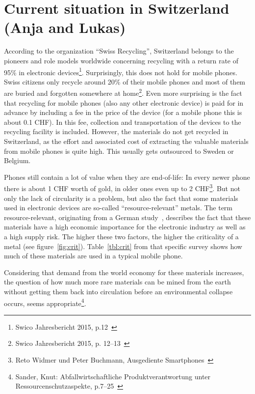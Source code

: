 \documentclass[11pt]{scrartcl}
\begin{document}
\section{Current situation in Switzerland (Anja and Lukas)}

According to the organization ``Swiss Recycling'', Switzerland belongs to the pioneers and role models worldwide concerning recycling with a return rate of 95\% in electronic devices\footnote{Swico Jahresbericht 2015, p.12~\cite{swico}}. Surprisingly, this does not hold for mobile phones. Swiss citizens only recycle around 20\% of their mobile phones and most of them are buried and forgotten somewhere at home\footnote{Swico Jahresbericht 2015, p. 12--13~\cite{swico}}. Even more surprising is the fact that recycling for mobile phones (also any other electronic device) is paid for in advance by including a fee in the price of the device (for a mobile phone this is about 0.1 CHF). In this fee, collection and transportation of the devices to the recycling facility is included. However, the materials do not get recycled in Switzerland, as the effort and associated cost of extracting the valuable materials from mobile phones is quite high. This usually gets outsourced to Sweden or Belgium.

Phones still contain a lot of value when they are end-of-life: In every newer phone there is about 1 CHF worth of gold, in older ones even up to 2 CHF\footnote{Reto Widmer und Peter Buchmann, Ausgediente Smartphones~\cite{SRF}}. But not only the lack of circularity is a problem, but also the fact that some materials used in electronic devices are so-called ``resource-relevant'' metals. The term resource-relevant, originating from a German study~\cite{Studie}, describes the fact that these materials have a high economic importance for the electronic industry as well as a high supply risk. The higher these two factors, the higher the criticality of a metal (see figure~\ref{fig:crit}). Table~\ref{tbl:crit} from that specific survey shows how much of these materials are used in a typical mobile phone.


Considering that demand from the world economy for these materials increases, the question of how much more rare materials can be mined from the earth without getting them back into circulation before an environmental collapse occurs, seems appropriate\footnote{Sander, Knut: Abfallwirtschaftliche Produktverantwortung unter Ressourcenschutzaspekte, p.7--25~\cite{Studie}}.
\end{document}
